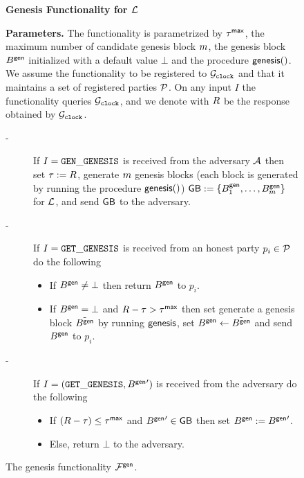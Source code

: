 \begin{figure}[]
\small
\setlength{\fboxsep}{8pt}
\begin{center}
\begin{boxedminipage}{12cm}
{\bf Genesis Functionality for $\mathcal{L}$}

{\bf Parameters.} The functionality is parametrized by $\tau^\mathsf{max}$, the maximum number of candidate genesis block $m$, the genesis block $B^\mathsf{gen}$ initialized with a default value $\bot$ and the procedure $\mathsf{genesis}()$.
We assume the functionality to be registered to $\mathcal{G}_{\mathtt{clock}}$ and that it maintains a set of registered parties $\mathcal{P}$.
On any input $I$ the functionality queries $\mathcal{G}_{\mathtt{clock}}$, and we denote with  $R$ be the response obtained by $\mathcal{G}_{\mathtt{clock}}$.  


\begin{description}
\item[-] If $I=\mathtt{GEN\_GENESIS}$ is received  from the adversary $\mathcal{A}$ then  set $\tau:=R$, generate $m$
 genesis blocks (each block is generated by running the procedure $\mathsf{genesis}()$) $\mathsf{GB}:=\{B^\mathsf{gen}_1,\dots, B^\mathsf{gen}_m\}$ for $\mathcal{L}$, and send $\mathsf{GB}$ to the adversary.
 
 \item[-] If $I=\mathtt{GET\_GENESIS}$ is received from an honest party $p_i\in\mathcal{P}$ do the following
 \begin{itemize}
 	\item If $B^\mathsf{gen}\neq\bot$ then return $B^\mathsf{gen}$ to $p_i$.
	\item If $B^\mathsf{gen} =\bot$ and $R-\tau>\tau^\mathsf{max}$ then set generate a genesis block $\tilde {B^\mathsf{gen}}$ by running 
	 $\mathsf{genesis}$, set
	$B^\mathsf{gen}\leftarrow \tilde {B^\mathsf{gen}}$ and send $B^\mathsf{gen}$ to $p_i$.
\end{itemize}
 \item[-] If $I=(\mathtt{GET\_GENESIS},{B^\mathsf{gen}}')$ is received from the adversary do the following 
 \begin{itemize}
 	\item If $(R-\tau)\leq\tau^\mathsf{max}$ and ${B^\mathsf{gen}}'\in\mathsf{GB}$ then set $B^\mathsf{gen}:={B^\mathsf{gen}}'$.
	\item Else, return $\bot$ to the adversary.
 \end{itemize}

\end{description}

\end{boxedminipage}
\end{center}
\caption{The genesis functionality $\mathcal{F}^\mathsf{gen}$.} 
\label{fig:genesis}
\end{figure}

